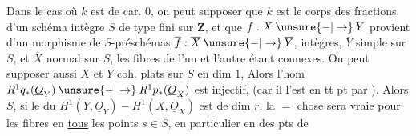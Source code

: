 Dans le cas où $k$ est de car. $0$, on peut supposer que $k$ est
le corps des fractions d'un schéma intègre $S$ de type fini sur $\mathbf Z$,
et que $f:X\mathbin{\unsure{-|\to}}Y$ provient d'un morphisme de
$S$-préschémas $\overline f:\overline X\mathbin{\unsure{-|\to}}\overline Y$,
intègres, $\overline Y$ simple sur $S$, et $\overline X$
 normal sur $S$, les fibres de l'un et l'autre étant
 connexes.
On peut supposer aussi $X$ et $Y$ coh. plats sur $S$ en dim $1$,
Alors 
l'hom
$R^1q_*(\underline O_{\overline Y})\mathbin{\unsure{-|\to}}
R^1p_*(\underline O_{\overline X})$
est injectif, 
(car il l'est en tt pt par ).
Alors  $S$, si le 
du $H^1(Y,\underline O_Y)\mathbin{-}H^1(X,\underline O_X)$
est de dim $r$, la $=$ chose sera vraie pour les fibres en \uline{tous}
les points $s\in S$, en particulier en des pts de
